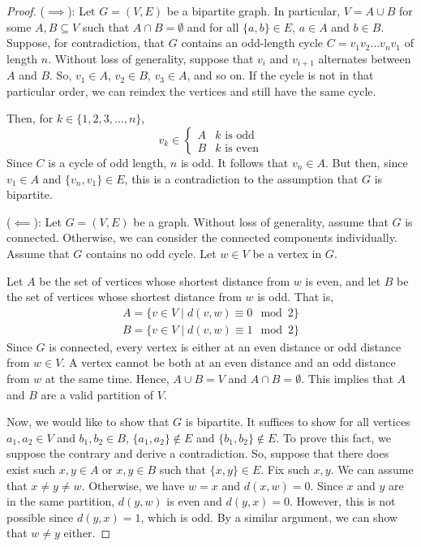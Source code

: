 \begin{proof}
    \hfill

    ($\implies$): Let $G=(V,E)$ be a bipartite graph. In particular, $V = A \cup B$ for some $A,B \subseteq V$ such that $A \cap B = \emptyset$ and for all $\{a,b\} \in E$, $a \in A$ and $b \in B$. Suppose, for contradiction, that $G$ contains an odd-length cycle $C = v_1 v_2 \ldots v_{n} v_1$ of length $n$. Without loss of generality, suppose that $v_i$ and $v_{i+1}$ alternates between $A$ and $B$. So, $v_1 \in A$, $v_2 \in B$, $v_3 \in A$, and so on. If the cycle is not in that particular order, we can reindex the vertices and still have the same cycle.

    Then, for $k \in \{1,2,3,\ldots,n\}$,
    $$
    v_k \in \begin{cases}
        A & \text{$k$ is odd} \\
        B & \text{$k$ is even}
    \end{cases}
    $$
    Since $C$ is a cycle of odd length, $n$ is odd. It follows that $v_n \in A$. But then, since $v_1 \in A$ and $\{v_n, v_1\} \in E$, this is a contradiction to the assumption that $G$ is bipartite.

    ($\impliedby$): Let $G=(V,E)$ be a graph. Without loss of generality, assume that $G$ is connected. Otherwise, we can consider the connected components individually. Assume that $G$ contains no odd cycle. Let $w \in V$ be a vertex in $G$.

    Let $A$ be the set of vertices whose shortest distance from $w$ is even, and let $B$ be the set of vertices whose shortest distance from $w$ is odd. That is,
    $$
    \begin{aligned}
        A = \{ v \in V \mid d(v,w) \equiv 0 \mod 2 \} \\
        B = \{ v \in V \mid d(v,w) \equiv 1 \mod 2 \}
    \end{aligned}
    $$
    Since $G$ is connected, every vertex is either at an even distance or odd distance from $w \in V$. A vertex cannot be both at an even distance and an odd distance from $w$ at the same time. Hence, $A \cup B = V$ and $A \cap B = \emptyset$. This implies that $A$ and $B$ are a valid partition of $V$.
    
    Now, we would like to show that $G$ is bipartite. It suffices to show for all vertices $a_1,a_2 \in V$ and $b_1,b_2 \in B$, $\{a_1,a_2\} \not\in E$ and $\{b_1,b_2\} \not\in E$. To prove this fact, we suppose the contrary and derive a contradiction. So, suppose that there does exist such $x,y \in A$ or $x,y \in B$ such that $\{x,y\} \in E$. Fix such $x,y$. We can assume that $x \neq y \neq w$. Otherwise, we have $w = x$ and $d(x,w) = 0$. Since $x$ and $y$ are in the same partition, $d(y,w)$ is even and $d(y,x) = 0$. However, this is not possible since $d(y,x) = 1$, which is odd. By a similar argument, we can show that $w \neq y$ either.
    

\end{proof}
